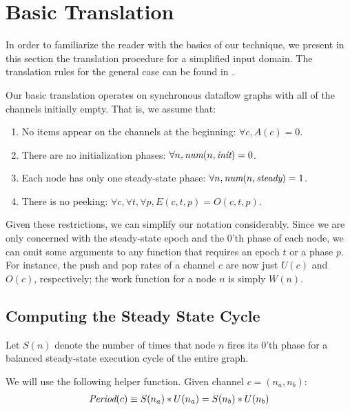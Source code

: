 \section{Basic Translation}

In order to familiarize the reader with the basics of our technique,
we present in this section the translation procedure for a simplified
input domain.  The translation rules for the general case can be found
in .

Our basic translation operates on synchronous dataflow graphs with all
of the channels initially empty.  That is, we assume that:
\begin{enumerate}

\item No items appear on the channels at the beginning:  $\forall c, A(c) = 0$.

\item There are no initialization phases: $\forall n, \mbox{\it num}(n, \mbox{\it init}) = 0$.

\item Each node has only one steady-state phase: $\forall n, \mbox{\it num}(n, \mbox{\it steady}) = 1$.

\item There is no peeking: $\forall c, \forall t, \forall p, E(c, t, p) = O(c, t, p)$.

\end{enumerate}

Given these restrictions, we can simplify our notation considerably.
Since we are only concerned with the steady-state epoch and the 0'th
phase of each node, we can omit some arguments to any function that
requires an epoch $t$ or a phase $p$.  For instance, the push and pop
rates of a channel $c$ are now just $U(c)$ and $O(c)$, respectively;
the work function for a node $n$ is simply $W(n)$.

\subsection{Computing the Steady State Cycle}

Let $S(n)$ denote the number of times that node $n$ fires its 0'th
phase for a balanced steady-state execution cycle of the entire
graph. 

We will use the following helper function.  Given channel $c = (n_a, n_b)$:
\begin{align*}
\mbox{\it Period}(c) \equiv S(n_a) * U(n_a) = S(n_b) * U(n_b)
\end{align*}

